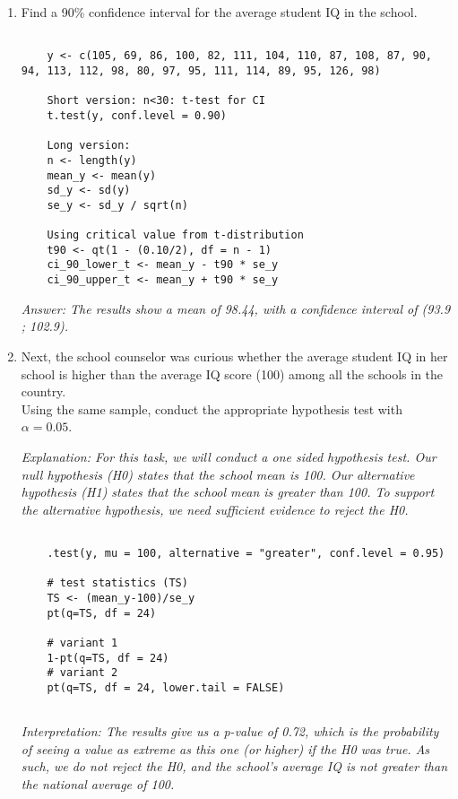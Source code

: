 \documentclass[12pt,letterpaper]{article}
\begin{document}
\begin{enumerate}
	\item Find a 90\% confidence interval for the average student IQ in the school.\\

\begin{verbatim}
	
	y <- c(105, 69, 86, 100, 82, 111, 104, 110, 87, 108, 87, 90, 94, 113, 112, 98, 80, 97, 95, 111, 114, 89, 95, 126, 98)
	
	Short version: n<30: t-test for CI
	t.test(y, conf.level = 0.90)
	
	Long version: 
	n <- length(y)
	mean_y <- mean(y)
	sd_y <- sd(y)
	se_y <- sd_y / sqrt(n)
	
	Using critical value from t-distribution
	t90 <- qt(1 - (0.10/2), df = n - 1)
	ci_90_lower_t <- mean_y - t90 * se_y
	ci_90_upper_t <- mean_y + t90 * se_y

\end{verbatim}

\textit{Answer: The results show a mean of 98.44, with a confidence interval of (93.9 ; 102.9). }

	
	\item Next, the school counselor was curious  whether  the average student IQ in her school is higher than the average IQ score (100) among all the schools in the country.\\ 
	\noindent Using the same sample, conduct the appropriate hypothesis test with $\alpha=0.05$.
	
\textit{Explanation: For this task, we will conduct a one sided hypothesis test. Our null hypothesis (H0) states that the school mean is 100. Our alternative hypothesis (H1) states that the school mean is greater than 100. To support the alternative hypothesis, we need sufficient evidence to reject the H0. }

\begin{verbatim}
	
	.test(y, mu = 100, alternative = "greater", conf.level = 0.95)
	
	# test statistics (TS)
	TS <- (mean_y-100)/se_y
	pt(q=TS, df = 24)
	
	# variant 1
	1-pt(q=TS, df = 24)
	# variant 2
	pt(q=TS, df = 24, lower.tail = FALSE)
	
\end{verbatim}

\textit{Interpretation: The results give us a p-value of 0.72, which is the probability of seeing a value as extreme as this one (or higher) if the H0 was true. As such, we do not reject the H0, and the school's average IQ is not greater than the national average of 100. }
	

\end{enumerate}
\end{document}

